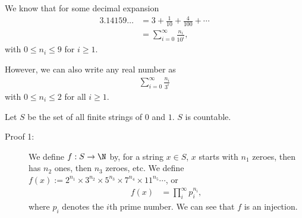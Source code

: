 \documentclass[10pt]{mypackage}
\begin{document}
\begin{example}
  We know that for some decimal expansion
  \begin{align*}
    3.14159\dots &= 3 + \frac{1}{10} + \frac{4}{100} + \cdots\\
                 &= \sum_{i=0}^{\infty}\frac{n_i}{10^i},
  \end{align*}
  with $0 \leq n_i \leq 9$ for $i \geq 1$.\newline

  However, we can also write any real number as
  \begin{align*}
    \sum_{i=0}^{\infty}\frac{n_i}{3^i}
  \end{align*}
  with $0 \leq n_i \leq 2$ for all $i \geq 1$.
\end{example}
\begin{example}
  Let $S$ be the set of all finite strings of $0$ and $1$. $S$ is countable.
  \begin{description}
    \item[Proof 1:] We define $f: S\rightarrow \N$ by, for a string $x\in S$, $x$ starts with $n_1$ zeroes, then has $n_2$ ones, then $n_3$ zeroes, etc. We define $f(x) := 2^{n_1}\times 3^{n_2}\times 5^{n_3}\times 7^{n_4}\times 11^{n_5}\cdots$, or
      \begin{align*}
        f(x) &= \prod_{i}^{\infty}p_{i}^{n_i},
      \end{align*}
      where $p_i$ denotes the $i$th prime number. We can see that $f$ is an injection.


\end{description}
\end{example}
\end{document}
